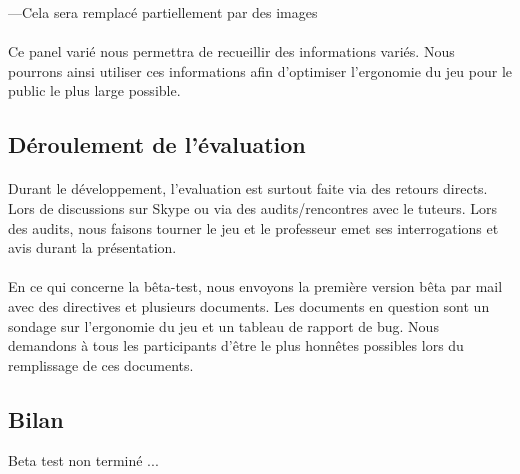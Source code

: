 \documentclass[11pt]{article} %
\begin{document}
---Cela sera remplacé partiellement par des images

\paragraph{}
Ce panel varié nous permettra de recueillir des informations variés. Nous pourrons ainsi utiliser ces informations afin d'optimiser l'ergonomie du jeu pour le public le plus large possible.

\subsection{Déroulement de l'évaluation}
\paragraph{}
Durant le développement, l'evaluation est surtout faite via des retours directs. Lors de discussions sur Skype ou via des audits/rencontres avec le tuteurs. Lors des audits, nous faisons tourner le jeu et le professeur emet ses interrogations et avis durant la présentation. 
\paragraph{}
En ce qui concerne la bêta-test, nous envoyons la première version bêta par mail avec des directives et plusieurs documents. Les documents en question sont un sondage sur l'ergonomie du jeu et un tableau de rapport de bug. Nous demandons à tous les participants d'être le plus honnêtes possibles lors du remplissage de ces documents.

\subsection{Bilan}


Beta test non terminé ...
\end{document}

